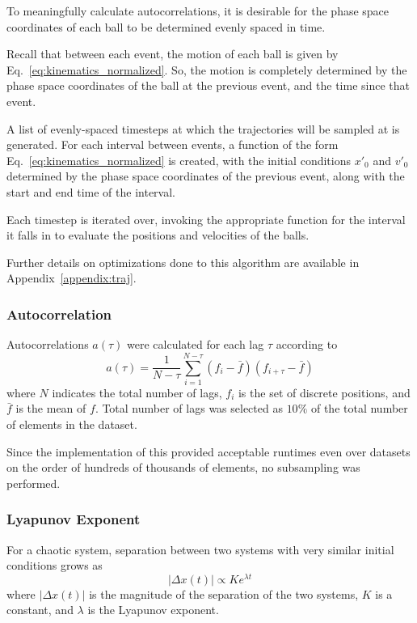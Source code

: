 \documentclass[pra,twocolumn,showpacs,amsmath,amssymb, aps, 10pt]{revtex4-1}
\begin{document}
To meaningfully calculate autocorrelations, it is desirable
for the phase space coordinates of each ball to be determined evenly spaced in time.

Recall that between each event, the motion of each ball is given by
Eq.~\ref{eq:kinematics_normalized}. So, the motion is completely determined by
the phase space coordinates of the ball at the previous event, and the time
since that event.

A list of evenly-spaced timesteps at which the trajectories will be sampled at
is generated. For each interval between events, a function of the form
Eq.~\ref{eq:kinematics_normalized} is created, with the initial conditions $x'_0$
and $v'_0$ determined by the phase space coordinates of the previous event, along
with the start and end time of the interval.

Each timestep is iterated over, invoking the appropriate function for the
interval it falls in to evaluate the positions and velocities of the balls.

Further details on optimizations done to this algorithm are available
in Appendix~\ref{appendix:traj}.


\subsubsection{Autocorrelation}

Autocorrelations $a(\tau)$ were calculated for each lag $\tau$ according to
\begin{equation}
  a(\tau) = \frac{1}{N-\tau} \sum_{i=1}^{N-\tau}
  \left(f_i - \bar f \right)
  \left(f_{i+\tau} - \bar f \right)
  \label{eq:acorr}
\end{equation}
where $N$ indicates the total number of lags, $f_i$ is the set of discrete
positions, and $\bar f$ is the mean of $f$. Total number of lags was selected
as $10\%$ of the total number of elements in the dataset.

Since the implementation of this provided acceptable runtimes even over datasets
on the order of hundreds of thousands of elements, no subsampling was performed.


\subsubsection{Lyapunov Exponent}

For a chaotic system, separation between two systems with very similar initial
conditions grows as
\begin{equation}
  | \Delta x(t) | \propto K e^{\lambda t}
\end{equation}
where $| \Delta x(t) |$ is the magnitude of the separation of the two systems,
$K$ is a constant, and $\lambda$ is the Lyapunov exponent.\cite{taylor}
\end{document}
